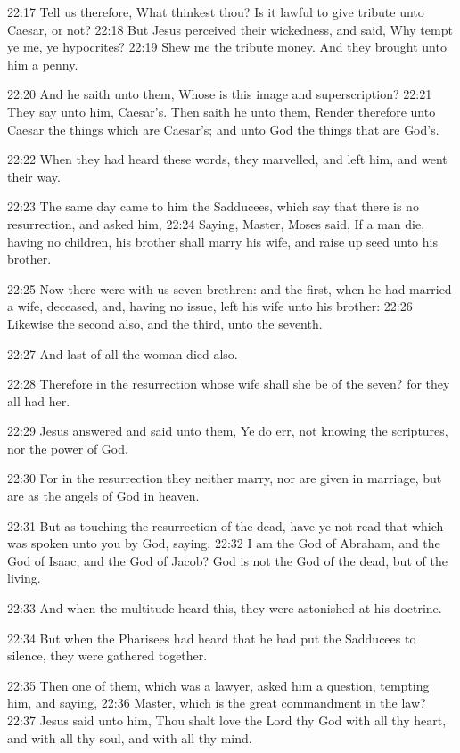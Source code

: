 22:17 Tell us therefore, What thinkest thou? Is it lawful to give
tribute unto Caesar, or not?  22:18 But Jesus perceived their
wickedness, and said, Why tempt ye me, ye hypocrites?  22:19 Shew me
the tribute money. And they brought unto him a penny.

22:20 And he saith unto them, Whose is this image and superscription?
22:21 They say unto him, Caesar's. Then saith he unto them, Render
therefore unto Caesar the things which are Caesar's; and unto God the
things that are God's.

22:22 When they had heard these words, they marvelled, and left him,
and went their way.

22:23 The same day came to him the Sadducees, which say that there is
no resurrection, and asked him, 22:24 Saying, Master, Moses said, If a
man die, having no children, his brother shall marry his wife, and
raise up seed unto his brother.

22:25 Now there were with us seven brethren: and the first, when he
had married a wife, deceased, and, having no issue, left his wife unto
his brother: 22:26 Likewise the second also, and the third, unto the
seventh.

22:27 And last of all the woman died also.

22:28 Therefore in the resurrection whose wife shall she be of the
seven?  for they all had her.

22:29 Jesus answered and said unto them, Ye do err, not knowing the
scriptures, nor the power of God.

22:30 For in the resurrection they neither marry, nor are given in
marriage, but are as the angels of God in heaven.

22:31 But as touching the resurrection of the dead, have ye not read
that which was spoken unto you by God, saying, 22:32 I am the God of
Abraham, and the God of Isaac, and the God of Jacob?  God is not the
God of the dead, but of the living.

22:33 And when the multitude heard this, they were astonished at his
doctrine.

22:34 But when the Pharisees had heard that he had put the Sadducees
to silence, they were gathered together.

22:35 Then one of them, which was a lawyer, asked him a question,
tempting him, and saying, 22:36 Master, which is the great commandment
in the law?  22:37 Jesus said unto him, Thou shalt love the Lord thy
God with all thy heart, and with all thy soul, and with all thy mind.

